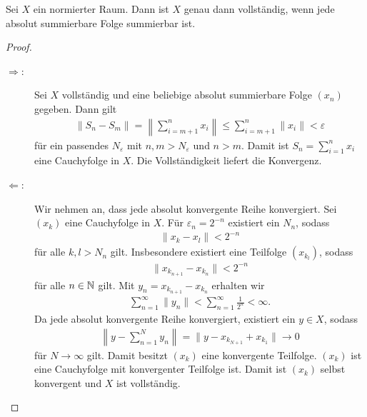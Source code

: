 \begin{sz}\label{thm:abs_to_conv}
	Sei $ X$ ein normierter Raum.
	Dann ist $ X $ genau dann vollständig, wenn jede absolut summierbare Folge summierbar ist.
\end{sz}

\begin{proof}
	\begin{description}
		\item[\glqq$ \Rightarrow $\grqq:]
		Sei $ X $ vollständig und eine beliebige absolut summierbare Folge $ (x_n) $ gegeben. Dann gilt
		\begin{align*}
			\| S_n - S_m \| = \left\| \sum \limits_{i = m+1}^n x_i \right\|
			\leq
			\sum \limits_{i = m+1}^n \| x_i \| < \varepsilon
		\end{align*}
		für ein passendes $ N_\varepsilon $ mit $ n,m > N_\varepsilon $ und $ n > m $.
		Damit ist $ S_n = \sum_{i=1}^n  x_i$ eine Cauchyfolge in $ X $. Die Vollständigkeit liefert die Konvergenz.		
		\item[\glqq$ \Leftarrow $\grqq:]
		Wir nehmen an, dass jede absolut konvergente Reihe konvergiert. Sei $ (x_k) $ eine Cauchyfolge in $ X $. Für $ \varepsilon_n = 2^{-n} $ existiert ein $ N_n $, sodass
		\begin{align*}
			\| x_k - x_l \| < 2^{-n}
		\end{align*}
		für alle $ k, l > N_n $ gilt. Insbesondere existiert eine Teilfolge $ (x_{k_l}) $, sodass
		\begin{align*}
			\| x_{k_{n+1}} - x_{k_n} \| < 2^{-n}
		\end{align*}
		für alle $ n \in \mathbb{N} $ gilt. Mit $ y_n = x_{k_{n+1}} - x_{k_n}  $ erhalten wir 
		\begin{align*}
			\sum \limits_{n=1}^\infty \| y_n \| < \sum \limits_{n=1}^\infty \frac{1}{2^n} < \infty.
		\end{align*}
		Da jede absolut konvergente Reihe konvergiert, existiert ein $ y \in X $, sodass
		\begin{align*}
			\left\| y - \sum_{n  = 1}^N y_n \right\|
			=
			\| y - x_{k_{N+1}} + x_{k_1} \| \to 0
		\end{align*}
		für $  N \to \infty $ gilt. Damit besitzt $ (x_k)$ eine konvergente Teilfolge.
		$ (x_k) $ ist eine Cauchyfolge mit konvergenter Teilfolge ist.
		Damit ist $ (x_k) $ selbst konvergent und $ X $ ist vollständig.	
	\end{description}	
\end{proof}


